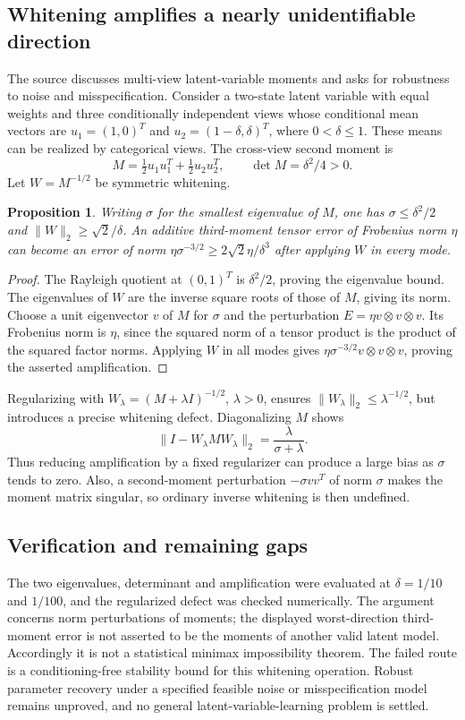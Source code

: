 \documentclass[11pt]{article}
\newtheorem{proposition}{Proposition}
\begin{document}
\subsection{Whitening amplifies a nearly unidentifiable direction}
The source discusses multi-view latent-variable moments and asks for robustness to noise and misspecification. Consider a two-state latent variable with equal weights and three conditionally independent views whose conditional mean vectors are $u_1=(1,0)^T$ and $u_2=(1-\delta,\delta)^T$, where $0<\delta\le1$. These means can be realized by categorical views. The cross-view second moment is
\[
M=\tfrac12u_1u_1^T+\tfrac12u_2u_2^T,
\qquad \det M=\delta^2/4>0.
\]
Let $W=M^{-1/2}$ be symmetric whitening.
\begin{proposition}
Writing $\sigma$ for the smallest eigenvalue of $M$, one has $\sigma\le\delta^2/2$ and $\|W\|_2\ge\sqrt2/\delta$. An additive third-moment tensor error of Frobenius norm $\eta$ can become an error of norm $\eta\sigma^{-3/2}\ge2\sqrt2\eta/\delta^3$ after applying $W$ in every mode.
\end{proposition}
\begin{proof}
The Rayleigh quotient at $(0,1)^T$ is $\delta^2/2$, proving the eigenvalue bound. The eigenvalues of $W$ are the inverse square roots of those of $M$, giving its norm. Choose a unit eigenvector $v$ of $M$ for $\sigma$ and the perturbation $E=\eta v\otimes v\otimes v$. Its Frobenius norm is $\eta$, since the squared norm of a tensor product is the product of the squared factor norms. Applying $W$ in all modes gives $\eta\sigma^{-3/2}v\otimes v\otimes v$, proving the asserted amplification.
\end{proof}
Regularizing with $W_\lambda=(M+\lambda I)^{-1/2}$, $\lambda>0$, ensures $\|W_\lambda\|_2\le\lambda^{-1/2}$, but introduces a precise whitening defect. Diagonalizing $M$ shows
\[
\|I-W_\lambda M W_\lambda\|_2=\frac{\lambda}{\sigma+\lambda}.
\]
Thus reducing amplification by a fixed regularizer can produce a large bias as $\sigma$ tends to zero. Also, a second-moment perturbation $-\sigma vv^T$ of norm $\sigma$ makes the moment matrix singular, so ordinary inverse whitening is then undefined.
\subsection{Verification and remaining gaps}
The two eigenvalues, determinant and amplification were evaluated at $\delta=1/10$ and $1/100$, and the regularized defect was checked numerically. The argument concerns norm perturbations of moments; the displayed worst-direction third-moment error is not asserted to be the moments of another valid latent model. Accordingly it is not a statistical minimax impossibility theorem. The failed route is a conditioning-free stability bound for this whitening operation. Robust parameter recovery under a specified feasible noise or misspecification model remains unproved, and no general latent-variable-learning problem is settled.
\end{document}
